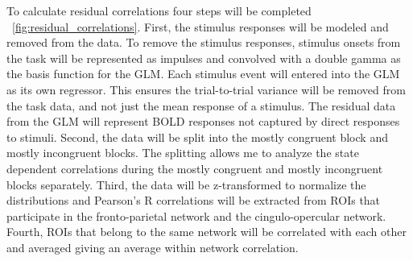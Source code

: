 \documentclass[phd,appendix,figures]{uithesis}
\begin{document}
\begin{itemize}
To calculate residual correlations four steps will be completed ~\ref{fig:residual_correlations}.
First, the stimulus responses will be modeled and removed from the data.
To remove the stimulus responses, stimulus onsets from the task will be represented as impulses and convolved with a double gamma as the basis function for the GLM. 
Each stimulus event will entered into the GLM as its own regressor.
This ensures the trial-to-trial variance will be removed from the task data, and not just the mean response of a stimulus. 
The residual data from the GLM will represent BOLD responses not captured by direct responses to stimuli. 
Second, the data will be split into the mostly congruent block and mostly incongruent blocks.
The splitting allows me to analyze the state dependent correlations during the mostly congruent and mostly incongruent blocks separately.
Third, the data will be z-transformed to normalize the distributions and Pearson's R correlations will be extracted from ROIs that participate in the fronto-parietal network and the cingulo-opercular network.
Fourth, ROIs that belong to the same network will be correlated with each other and averaged giving an average within network correlation.


\end{itemize}
\end{document}
